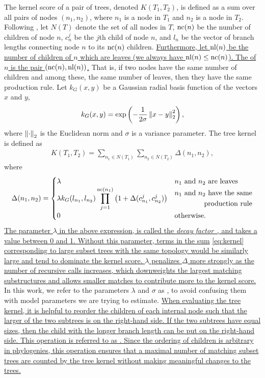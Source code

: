 The kernel score of a pair of trees, denoted $K(T_1, T_2)$, is defined as a sum
over all pairs of nodes $(n_1, n_2)$, where $n_1$ is a node in $T_1$ and $n_2$
is a node in $T_2$. Following \textcite{poon2013mapping}, let $N(T)$ denote the
set of all nodes in $T$, $\operatorname{nc}(n)$ be the number of children of node $n$,
$c_n^{j}$ be the $j$th child of node $n$, and $l_n$ be the vector of branch
lengths connecting node $n$ to its $\operatorname{nc}(n)$ children. {\color{blue}\uline{
Furthermore, let $\operatorname{nl}(n)$ be the number of children of $n$ which are leaves (we
always have $\operatorname{nl}(n) \leq \operatorname{nc}(n)$). The  of $n$ is the
pair $(\operatorname{nc}(n), \operatorname{nl}(n))$.}} That is, if two nodes have the same number of
children and among these, the same number of leaves, then they have the same
production rule. Let $k_G(x, y)$ be a Gaussian radial basis function of the
vectors $x$ and $y$,
\[
  k_G(x, y) = \exp\left(-\frac{1}{2\sigma} \left\lVert x - y\right\rVert_2^2\right),
\]
where $\left\lVert\cdot\right\rVert_2$ is the Euclidean norm and $\sigma$ is a variance
parameter. The tree kernel is defined as 
\begin{align}
  K(T_1, T_2) = \sum_{n_1 \in N(T_1)} \sum_{n_2 \in N(T_2)} \Delta (n_1, n_2),
  \label{eq:kernel}
\end{align}
where
\[
  \Delta(n_1, n_2) =
  \begin{cases}
    \lambda & n_1 \text{ and } n_2 \text{ are leaves} \\
    \lambda k_G(l_{n_1}, l_{n_2}) \displaystyle\prod_{j=1}^{\operatorname{nc}(n_1)} \left(1 +
    \Delta(c_{n_1}^j, c_{n_2}^j) \right) & \begin{aligned} n_1 \text{ and } n_2 \text{ have the same} \\ \text{production rule} \end{aligned} \\
    0 & \text{otherwise}.
  \end{cases}
\]
{\color{blue}\uline{
The parameter $\lambda$ in the above expression, is called the \emph{decay
factor}~\autocite{moschitti2006making}, and takes a value between 0 and 1.
Without this parameter, terms in the sum} \ref{eq:kernel} \uline{corresponding
to large subset trees with the same topology would be similarly large and tend
to dominate the kernel score. $\lambda$ penalizes $\Delta$ more strongly as the
number of recursive calls increases, which downweights the largest matching
substructures and allows smaller matches to contribute more to the kernel
score. }} In this work, we refer to the parameters $\lambda$ and $\sigma$ as
, to avoid confusing them with model parameters we are
trying to estimate. {\color{blue}\uline{ When evaluating the tree kernel, it is
helpful to reorder the children of each internal node such that the larger of
the two subtrees is on the right-hand side. If the two subtrees have equal
sizes, then the child with the longer branch length can be put on the
right-hand side. This operation is referred to as . Since the
ordering of children is arbitrary in phylogenies, this operation ensures that a
maximal number of matching subset trees are counted by the tree kernel without 
making meaningful changes to the trees. }}

